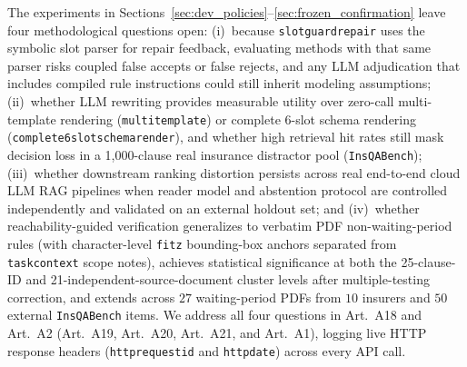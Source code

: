 \documentclass[10pt,twocolumn]{article}
\renewcommand{\_}{\textunderscore\allowbreak}
\begin{document}
The experiments in Sections~\ref{sec:dev_policies}--\ref{sec:frozen_confirmation} leave four methodological questions open: (i)~because \texttt{slot\_guard\_repair} uses the symbolic slot parser for repair feedback, evaluating methods with that same parser risks coupled false accepts or false rejects, and any LLM adjudication that includes compiled rule instructions could still inherit modeling assumptions; (ii)~whether LLM rewriting provides measurable utility over zero-call multi-template rendering (\texttt{multi\_template\_3}) or complete 6-slot schema rendering (\texttt{complete\_6slot\_schema\_render}), and whether high retrieval hit rates still mask decision loss in a 1,000-clause real insurance distractor pool (\texttt{InsQABench}); (iii)~whether downstream ranking distortion persists across real end-to-end cloud LLM RAG pipelines when reader model and abstention protocol are controlled independently and validated on an external holdout set; and (iv)~whether reachability-guided verification generalizes to verbatim PDF non-waiting-period rules (with character-level \texttt{fitz} bounding-box anchors separated from \texttt{task\_context} scope notes), achieves statistical significance at both the 25-clause-ID and 21-independent-source-document cluster levels after multiple-testing correction, and extends across $27$ waiting-period PDFs from $10$ insurers and $50$ external \texttt{InsQABench} items. We address all four questions in Art.~A18 and Art.~A2 (Art.~A19, Art.~A20, Art.~A21, and Art.~A1), logging live HTTP response headers (\texttt{http\_request\_id} and \texttt{http\_date}) across every API call.
\end{document}
